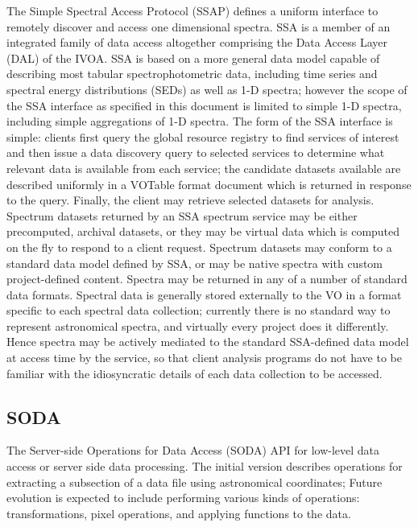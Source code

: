 \documentclass[11pt,a4paper]{ivoa}
\begin{document}
The Simple Spectral Access Protocol (SSAP) \citep{2012ivoa.spec.0210T} defines a uniform interface to remotely discover and 
access one dimensional spectra. SSA is a member of an integrated family of data access 
altogether comprising the Data Access Layer (DAL) of the IVOA. SSA is based on a more 
general data model capable of describing most tabular spectrophotometric data, including 
time series and spectral energy distributions (SEDs) as well as 1-D spectra; however the 
scope of the SSA interface as specified in this document is limited to simple 1-D spectra,
including simple aggregations of 1-D spectra. The form of the SSA interface is simple: 
clients first query the global resource registry to find services of interest and then 
issue a data discovery query to selected services to determine what relevant data is 
available from each service; the candidate datasets available are described uniformly 
in a VOTable format document which is returned in response to the query. Finally, the 
client may retrieve selected datasets for analysis. Spectrum datasets returned by an SSA 
spectrum service may be either precomputed, archival datasets, or they may be virtual 
data which is computed on the fly to respond to a client request. Spectrum datasets may 
conform to a standard data model defined by SSA, or may be native spectra with custom 
project-defined content. Spectra may be returned in any of a number of standard data 
formats. Spectral data is generally stored externally to the VO in a format specific to 
each spectral data collection; currently there is no standard way to represent astronomical 
spectra, and virtually every project does it differently. Hence spectra may be actively 
mediated to the standard SSA-defined data model at access time by the service, so that 
client analysis programs do not have to be familiar with the idiosyncratic details of each 
data collection to be accessed. 

\subsection{SODA} 

The Server-side Operations for Data Access (SODA) \citep{2017ivoa.spec.0517B} API for low-level data access or server side 
data processing. The initial version describes operations for extracting a subsection of a data
file using astronomical coordinates; Future evolution is expected to include performing 
various kinds of operations: transformations, pixel operations, and applying functions to the data.
\end{document}
